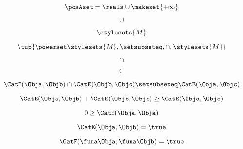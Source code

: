 {\begin{forslides}
        \begin{equation}
            \label{eq:slides_enrichment_41}
            \posAset = \reals \cup \makeset{+ \infty}
        \end{equation}

        \begin{equation}
            \label{eq:slides_enrichment_42}
            \cup
        \end{equation}

        \begin{equation}
            \label{eq:slides_enrichment_43}
            \stylesets{M}
        \end{equation}

        \begin{equation}
            \label{eq:slides_enrichment_44}
            \tup{\powerset \stylesets{M}, \setsubseteq, \cap, \stylesets{M}}
        \end{equation}

        \begin{equation}
            \label{eq:slides_enrichment_45}
            \cap
        \end{equation}

        \begin{equation}
            \label{eq:slides_enrichment_46}
            \subseteq
        \end{equation}

        \begin{equation}
            \label{eq:slides_enrichment_47}
            \CatE(\Obja, \Objb) \cap \CatE(\Objb, \Objc) \setsubseteq \CatE(\Obja, \Objc)
        \end{equation}

        \begin{equation}
            \label{eq:slides_enrichment_48}
            \CatE(\Obja, \Objb) + \CatE(\Objb, \Objc) \geq \CatE(\Obja, \Objc)
        \end{equation}

        \begin{equation}
            \label{eq:slides_enrichment_49}
            0 \geq \CatE(\Obja, \Obja)
        \end{equation}

        \begin{equation}
            \label{eq:slides_enrichment_50}
            \CatE(\Obja,\Objb) = \true
        \end{equation}

        \begin{equation}
            \label{eq:slides_enrichment_51}
            \CatF(\funa \Obja, \funa \Objb) = \true
        \end{equation}


\end{forslides}}
